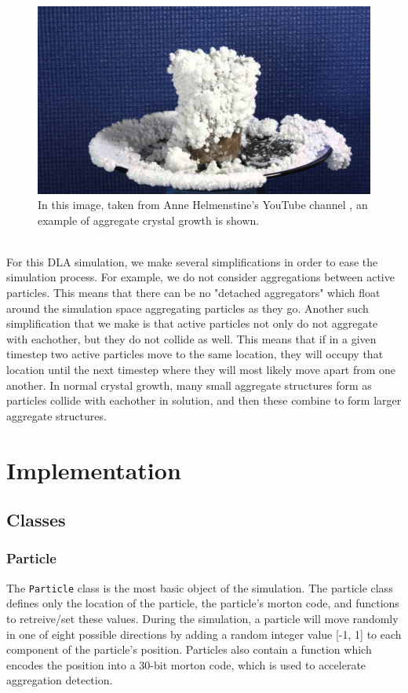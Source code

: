 \documentclass[fleqn,10pt]{UserGuideArx} %
\begin{document}
\begin{figure}[!h]\centering %
    \includegraphics[width=\linewidth]{images/saltCrystal.jpg}
    \caption{In this image, taken from Anne Helmenstine's YouTube channel \cite{Helmenstine:2011}, an example of aggregate crystal growth is shown.}
    \label{fig:AnneHelmenstineSalt}
    \end{figure}

~\\

For this DLA simulation, we make several simplifications in order to ease the simulation process. For example, we do not consider aggregations between active particles. This means that there can be no "detached aggregators" which float around the simulation space aggregating particles as they go. Another such simplification that we make is that active particles not only do not aggregate with eachother, but they do not collide as well. This means that if in a given timestep two active particles move to the same location, they will occupy that location until the next timestep where they will most likely move apart from one another. In normal crystal growth, many small aggregate structures form as particles collide with eachother in solution, and then these combine to form larger aggregate structures.
\section{Implementation}
\subsection{Classes}
\subsubsection{Particle}
The \texttt{Particle} class is the most basic object of the simulation. The particle class defines only the location of the particle, the particle’s morton code, and functions to retreive/set these values. During the simulation, a particle will move randomly in one of eight possible directions by adding a random integer value [-1, 1] to each component of the particle’s position. Particles also contain a function which encodes the position into a 30-bit morton code, which is used to accelerate aggregation detection.\\
\end{document}
